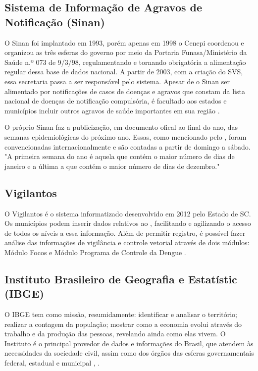\subsection{Sistema de Informação de Agravos de Notificação (Sinan)}

O \acrfull{Sinan} foi implantado em 1993, porém apenas em 1998 o \acrfull{Cenepi} coordenou e organizou as três esferas do governo por meio da Portaria \acrshort{Funasa}/Ministério da Saúde n.º 073 de 9/3/98, regulamentando  e tornando obrigatória a alimentação regular dessa base de dados nacional. A partir de 2003, com a criação do \acrfull{SVS}, essa secretaria passa a ser responsável pelo sistema. Apesar de o \acrshort{Sinan} ser alimentado por notificações  de casos de doenças e agravos que constam da lista nacional de doenças de notificação compulsória, é facultado aos estados e municípios incluir outros agravos de saúde importantes em sua região \cite{SINANWEB, SINAN07Ministerio}.

\indent O próprio \acrshort{Sinan} faz a publicização, em documento ofical ao final do ano, das semanas epidemiológicas do próximo ano. Essas, como mencionado pelo , foram convencionadas internacionalmente e são contadas a partir de domingo a sábado. "A primeira semana do ano é aquela que contém o maior número de dias de janeiro e a última a que contém o maior número de dias de dezembro."

\subsection{Vigilantos}

O Vigilantos é o sistema informatizado  desenvolvido em 2012 pelo Estado de \acrlong{SC}. Os municípios podem inserir dados relativos ao , facilitando e agilizando o acesso de todos os níveis a essa informação. Além de permitir registro, é possível fazer análise das informações de vigilância e controle vetorial através de dois módulos: Módulo Focos e Módulo Programa de Controle da Dengue \cite{Vigilantos}.

\subsection{Instituto Brasileiro de Geografia e Estatístic (IBGE)}

O \acrshort{IBGE} tem como missão, resumidamente: identificar e analisar o território; realizar a contagem da população; mostrar como a economia evolui através do trabalho e da produção das pessoas, revelando ainda como elas vivem.  O Instituto é o principal provedor de dados e informações do Brasil, que atendem às necessidades da sociedade civil, assim como dos órgãos das esferas governamentais federal, estadual e municipal \cite{IBGE22}, \cite{IBGE23prev}.

